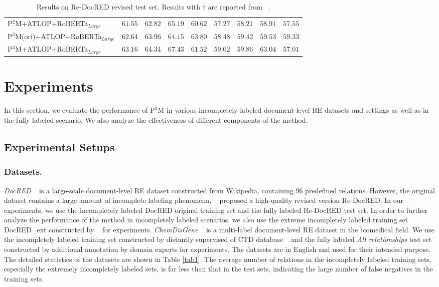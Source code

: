 \documentclass[letterpaper]{article}
\begin{document}
\begin{table}[!ht]
\begin{tabular}{lcccc|cccc}
P$^{2}$M+ATLOP+RoBERTa$_{Large}$ & $61.55$ & $62.82$ & $65.19$ & $60.62$ & $57.27$ & $58.21$ & $58.91$ & $57.55$ \\
P$^{3}$M(ori)+ATLOP+RoBERTa$_{Large}$ & $62.64$ & $63.96$ & $64.15$ & $\mathbf{63.80}$ & $58.48$ & $59.42$ & $59.53$ & $59.33$ \\
P$^{3}$M+ATLOP+RoBERTa$_{Large}$ & $\mathbf{63.16}$ & $\mathbf{64.34}$ & $67.43$ & $61.52$ & $\mathbf{59.02}$ & $\mathbf{59.86}$ & $63.04$ & $57.01$ \\
\bottomrule
\end{tabular}
\caption{
Results on Re-DocRED revised test set. Results with $\dagger$ are reported from ~\cite{DBLP:conf/emnlp/WangLHZ22}.
}
\label{tab2}
\end{table}

\section{Experiments}
In this section, we evaluate the performance of P$^{3}$M in various incompletely labeled document-level RE datasets and settings as well as in the fully labeled scenario. We also analyze the effectiveness of different components of the method.

\subsection{Experimental Setups}

\subsubsection{Datasets.}
\emph{DocRED} ~\cite{DBLP:conf/acl/YaoYLHLLLHZS19} is a large-scale document-level RE dataset constructed from Wikipedia, containing 96 predefined relations. However, the original dataset contains a large amount of incomplete labeling phenomena, ~\cite{DBLP:conf/emnlp/Tan0BNA22} proposed a high-quality revised version Re-DocRED. In our experiments, we use the incompletely labeled DocRED original training set and the fully labeled Re-DocRED test set. In order to further analyze the performance of the method in incompletely labeled scenarios, we also use the extreme incompletely labeled training set DocRED\_ext constructed by ~\cite{DBLP:conf/emnlp/WangLHZ22} for experiments. \enspace \emph{ChemDisGene} ~\cite{DBLP:conf/lrec/ZhangMTM22} is a multi-label document-level RE dataset in the biomedical field. We use the incompletely labeled training set constructed by distantly supervised of CTD database ~\cite{DBLP:journals/nar/DavisGJSWWM21} and the fully labeled \emph{All relationships} test set constructed by additional annotation by domain experts for experiments. \enspace The datasets are in English and used for their intended purpose. The detailed statistics of the datasets are shown in Table \ref{tab1}. The average number of relations in the incompletely labeled training sets, especially the extremely incompletely labeled sets, is far less than that in the test sets, indicating the large number of false negatives in the training sets.
\end{document}
